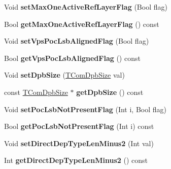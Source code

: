 \begin{DoxyCompactItemize}
\mbox{\label{class_t_com_v_p_s_a75a630f38a5cb9034b3591432322d1e2}} 
Void {\bfseries set\+Max\+One\+Active\+Ref\+Layer\+Flag} (Bool flag)
\item 
\mbox{\label{class_t_com_v_p_s_a93dedfb65e835bab0bd02308faf938d0}} 
Bool {\bfseries get\+Max\+One\+Active\+Ref\+Layer\+Flag} () const
\item 
\mbox{\label{class_t_com_v_p_s_a5dce067f9c0fbc450ceea4a6381bc07f}} 
Void {\bfseries set\+Vps\+Poc\+Lsb\+Aligned\+Flag} (Bool flag)
\item 
\mbox{\label{class_t_com_v_p_s_a27e6efd77f00ebb8a67ae0097c7ae090}} 
Bool {\bfseries get\+Vps\+Poc\+Lsb\+Aligned\+Flag} () const
\item 
\mbox{\label{class_t_com_v_p_s_a28bc17652b12ae43eabbaf50cf5d46aa}} 
Void {\bfseries set\+Dpb\+Size} (\hyperlink{class_t_com_dpb_size}{T\+Com\+Dpb\+Size} val)
\item 
\mbox{\label{class_t_com_v_p_s_a453f17cd930eaf0bfff86a0aa2d0e853}} 
const \hyperlink{class_t_com_dpb_size}{T\+Com\+Dpb\+Size} $\ast$ {\bfseries get\+Dpb\+Size} () const
\item 
\mbox{\label{class_t_com_v_p_s_a370fcabc17a78eae2e5954e5a45daf9f}} 
Void {\bfseries set\+Poc\+Lsb\+Not\+Present\+Flag} (Int i, Bool flag)
\item 
\mbox{\label{class_t_com_v_p_s_a1adc355b0e118d99d8617bd5cafb1bb3}} 
Bool {\bfseries get\+Poc\+Lsb\+Not\+Present\+Flag} (Int i) const
\item 
\mbox{\label{class_t_com_v_p_s_ae8cf80b47a9f317901a4a478bce3e2d9}} 
Void {\bfseries set\+Direct\+Dep\+Type\+Len\+Minus2} (Int val)
\item 
\mbox{\label{class_t_com_v_p_s_a2187654ac0a4b00b57702c132583c065}} 
Int {\bfseries get\+Direct\+Dep\+Type\+Len\+Minus2} () const
\item 
\mbox{\label{class_t_com_v_p_s_ab691e4255bf5fb60d466a6485f35c421}} 

\end{DoxyCompactItemize}
